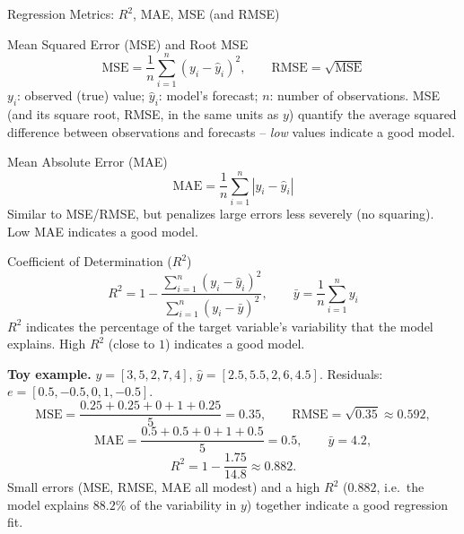 \documentclass[aspectratio=169,10pt]{beamer}
\begin{document}
\begin{frame}[allowframebreaks]{Regression Metrics: $R^2$, MAE, MSE (and RMSE)}
  \begin{block}{Mean Squared Error (MSE) and Root MSE}
    \[
      \text{MSE} = \frac{1}{n}\sum_{i=1}^{n}(y_i - \hat y_i)^2, \qquad
      \text{RMSE} = \sqrt{\text{MSE}}
    \]
    $y_i$: observed (true) value; $\hat y_i$: model's forecast; $n$: number
    of observations. MSE (and its square root, RMSE, in the same units as
    $y$) quantify the average squared difference between observations and
    forecasts -- \emph{low} values indicate a good model.
  \end{block}

  \begin{block}{Mean Absolute Error (MAE)}
    \[
      \text{MAE} = \frac{1}{n}\sum_{i=1}^{n}\left|y_i-\hat y_i\right|
    \]
    Similar to MSE/RMSE, but penalizes large errors less severely (no
    squaring). Low MAE indicates a good model.
  \end{block}

  \framebreak

  \begin{block}{Coefficient of Determination ($R^2$)}
    \[
      R^2 = 1 - \frac{\sum_{i=1}^n (y_i-\hat y_i)^2}{\sum_{i=1}^n (y_i-\bar y)^2},
      \qquad \bar y = \frac{1}{n}\sum_{i=1}^n y_i
    \]
    $R^2$ indicates the percentage of the target variable's variability that
    the model explains. High $R^2$ (close to $1$) indicates a good model.
  \end{block}

  \textbf{Toy example.} $y = [3,5,2,7,4]$, $\hat y = [2.5,5.5,2,6,4.5]$.
  Residuals: $e=[0.5,-0.5,0,1,-0.5]$.
  \[
    \text{MSE} = \frac{0.25+0.25+0+1+0.25}{5} = 0.35, \qquad
    \text{RMSE} = \sqrt{0.35} \approx 0.592,
  \]
  \[
    \text{MAE} = \frac{0.5+0.5+0+1+0.5}{5} = 0.5, \qquad \bar y = 4.2,
  \]
  \[
    R^2 = 1 - \frac{1.75}{14.8} \approx 0.882.
  \]
  Small errors (MSE, RMSE, MAE all modest) and a high $R^2$ ($0.882$, i.e.\
  the model explains $88.2\%$ of the variability in $y$) together indicate
  a good regression fit.
\end{frame}
\end{document}

